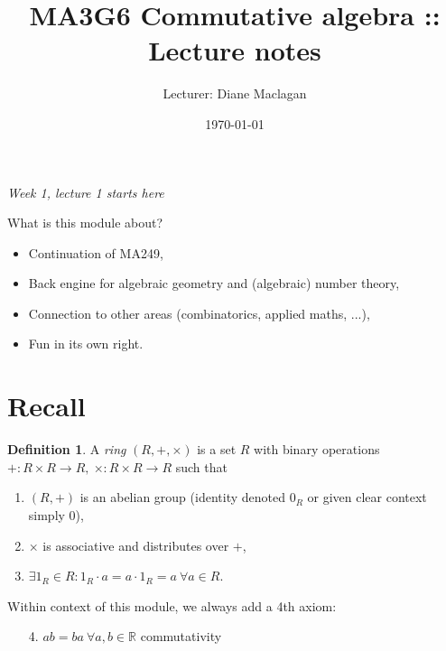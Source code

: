 \documentclass[a4paper]{article}
\title{MA3G6 Commutative algebra :: Lecture notes}
\author{Lecturer: Diane Maclagan}
\date{\today}
\theoremstyle{definition}
\newtheorem{defn}{Definition}[subsection]
\begin{document}
\maketitle
\thispagestyle{empty}

\tableofcontents
\thispagestyle{empty}
\newpage
\setcounter{page}{1}

\begin{flushright}
\textit{Week 1, lecture 1 starts here}
\end{flushright}

What is this module about?
\begin{itemize}
\item Continuation of MA249,
\item Back engine for algebraic geometry and (algebraic) number theory,
\item Connection to other areas (combinatorics, applied maths, ...),
\item Fun in its own right.
\end{itemize}

\section*{Recall}
\begin{defn}
A \textit{ring} $(R,+,\times)$ is a set $R$ with binary operations $+:R\times R\rightarrow R,\ \times:R\times R\rightarrow R$ such that
\begin{enumerate}
\item $(R,+)$ is an abelian group (identity denoted $0_R$ or given clear context simply 0),
\item $\times$ is associative and distributes over $+$,
\item $\exists 1_R\in R:1_R\cdot a = a\cdot 1_R=a\ \forall a \in R$.
\end{enumerate}
\end{defn}
Within context of this module, we always add a 4th axiom:
\begin{enumerate}
\item[4.] $ab=ba \ \forall a,b\in \mathbb R$ \qquad commutativity
\end{enumerate}
\end{document}
